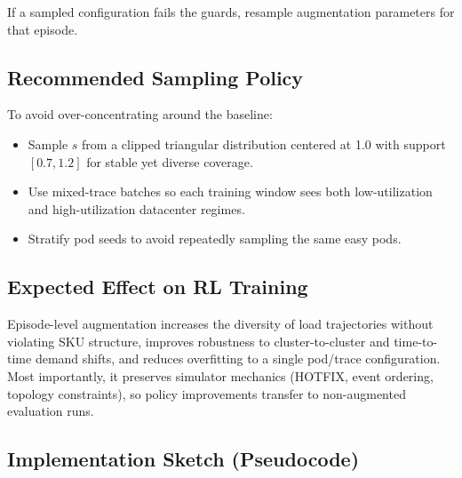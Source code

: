 \documentclass[11pt]{article}
\begin{document}
If a sampled configuration fails the guards, resample augmentation
parameters for that episode.

\subsection{Recommended Sampling Policy}

To avoid over-concentrating around the baseline:
\begin{itemize}
  \item Sample $s$ from a clipped triangular distribution centered at 1.0
  with support $[0.7,1.2]$ for stable yet diverse coverage.
  \item Use mixed-trace batches so each training window sees both
  low-utilization and high-utilization datacenter regimes.
  \item Stratify pod seeds to avoid repeatedly sampling the same easy pods.
\end{itemize}

\subsection{Expected Effect on RL Training}

Episode-level augmentation increases the diversity of load trajectories
without violating SKU structure, improves robustness to cluster-to-cluster
and time-to-time demand shifts, and reduces overfitting to a single
pod/trace configuration. Most importantly, it preserves simulator
mechanics (HOTFIX, event ordering, topology constraints), so policy
improvements transfer to non-augmented evaluation runs.

\subsection{Implementation Sketch (Pseudocode)}
\end{document}
